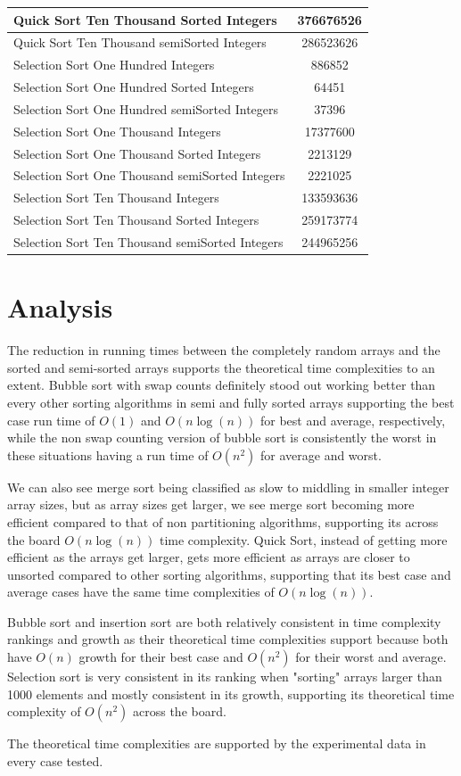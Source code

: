 \documentclass[]{article}
\begin{document}
\begin{tabular}{|l|c|}
		\hline
		Quick Sort Ten Thousand Sorted Integers & 376676526\\
		\hline
		Quick Sort Ten Thousand semiSorted Integers & 286523626\\
		\hline
		Selection Sort One Hundred Integers & 886852\\
		\hline
		Selection Sort One Hundred Sorted Integers & 64451\\
		\hline
		Selection Sort One Hundred semiSorted Integers & 37396\\
		\hline
		Selection Sort One Thousand Integers & 17377600\\
		\hline
		Selection Sort One Thousand Sorted Integers & 2213129\\
		\hline
		Selection Sort One Thousand semiSorted Integers & 2221025\\
		\hline
		Selection Sort Ten Thousand Integers & 133593636\\
		\hline
		Selection Sort Ten Thousand Sorted Integers & 259173774\\
		\hline
		Selection Sort Ten Thousand semiSorted Integers & 244965256\\
		\hline
	\end{tabular}
\newpage


\section{Analysis}
The reduction in running times between the completely random arrays and the sorted and semi-sorted arrays supports the theoretical time complexities to an extent. Bubble sort with swap counts definitely stood out working better than every other sorting algorithms in semi and fully sorted arrays supporting the best case run time of $ O(1) $ and $ O(n \log(n)) $ for best and average, respectively, while the non swap counting version of bubble sort is consistently the worst in these situations having a run time of $ O(n^2) $ for average and worst.

We can also see merge sort being classified as slow to middling in smaller integer array sizes, but as array sizes get larger, we see merge sort becoming more efficient compared to that of non partitioning algorithms, supporting its across the board $ O(n \log(n)) $ time complexity. Quick Sort, instead of getting more efficient as the arrays get larger, gets more efficient as arrays are closer to unsorted compared to other sorting algorithms, supporting that its best case and average cases have the same time complexities of $ O(n \log(n)) $.

Bubble sort and insertion sort are both relatively consistent in time complexity rankings and growth as their theoretical time complexities support because both have $ O(n) $ growth for their best case and $ O(n^2) $ for their worst and average. Selection sort is very consistent in its ranking when "sorting" arrays larger than 1000 elements and mostly consistent in its growth, supporting its theoretical time complexity of $ O(n^2) $ across the board. 

The theoretical time complexities are supported by the experimental data in every case tested.
\end{document}
